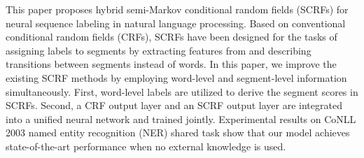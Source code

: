 This paper proposes hybrid semi-Markov conditional random fields (SCRFs) for neural sequence labeling in natural language processing. Based on conventional conditional random fields (CRFs), SCRFs have been designed for the tasks of assigning labels to segments by extracting features from and describing transitions between segments instead of words. In this paper, we improve the existing SCRF methods by employing word-level and segment-level information simultaneously. First, word-level labels are utilized to derive the segment scores in SCRFs. Second, a CRF output layer and an SCRF output layer are integrated into a unified neural network and trained jointly. Experimental results on CoNLL 2003 named entity recognition (NER) shared task show that our model achieves state-of-the-art performance when no external knowledge is used.
